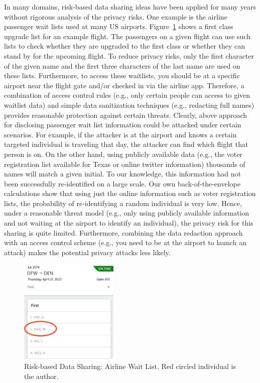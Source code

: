 \documentclass{article}
\begin{document}
In many domains, risk-based data sharing ideas have been applied for many years without rigorous %
analysis of the privacy risks.  One example is the airline passenger wait lists used at many US airports. %
Figure~\ref{fig:airline} shows a first class upgrade list for an example flight. The passengers on a given flight can use such lists to check whether they are upgraded to the first class or whether they can stand by for the upcoming flight. To reduce privacy risks, only the first character of the given name and the first three characters of the last name are used on these lists. Furthermore, to access these waitlists, you should be at a specific airport near the flight gate and/or checked in via the airline app. Therefore, a combination of access control rules (e.g., only certain people can access to given waitlist data) and simple data sanitization techniques (e.g., redacting full names) provides reasonable protection against certain threats. 
Clearly, above approach for disclosing passenger wait list information could be attacked under certain scenarios. For example, if the attacker is at the airport and knows a certain targeted individual is traveling that day, the attacker can find which flight that person is on. On the other hand, using publicly available data (e.g., the voter registration list available for Texas or online twitter information) thousands of names will match a given initial. To our knowledge, this information had not been successfully re-identified on a large scale. Our own back-of-the-envelope calculations show that using just the online information such as voter registration lists, the probability of re-identifying a random individual is very low. Hence, under a reasonable threat model (e.g., only using publicly available information and not waiting at the airport to identify an individual), the privacy risk for this sharing is quite limited. Furthermore, combining the data redaction approach with an access control scheme (e.g., you need to be at the airport to launch an attack) makes the potential privacy attacks less likely.


\begin{figure}[!htb]
 \centering
\includegraphics[height=5cm]{letters/airline.png}
 \caption{Risk-based Data Sharing: Airline Wait List. Red circled individual is the author.}
 \label{fig:airline}
\end{figure}
\end{document}
